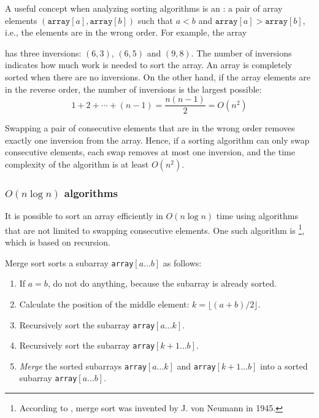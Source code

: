 A useful concept when analyzing sorting
algorithms is an :
a pair of array elements
$(\texttt{array}[a],\texttt{array}[b])$ such that
$a<b$ and $\texttt{array}[a]>\texttt{array}[b]$,
i.e., the elements are in the wrong order.
For example, the array
\begin{center}
\end{center}
has three inversions: $(6,3)$, $(6,5)$ and $(9,8)$.
The number of inversions indicates
how much work is needed to sort the array.
An array is completely sorted when
there are no inversions.
On the other hand, if the array elements
are in the reverse order,
the number of inversions is the largest possible:
\[1+2+\cdots+(n-1)=\frac{n(n-1)}{2} = O(n^2)\]

Swapping a pair of consecutive elements that are
in the wrong order removes exactly one inversion
from the array.
Hence, if a sorting algorithm can only
swap consecutive elements, each swap removes
at most one inversion, and the time complexity
of the algorithm is at least $O(n^2)$.

\subsubsection{$O(n \log n)$ algorithms}


It is possible to sort an array efficiently
in $O(n \log n)$ time using algorithms
that are not limited to swapping consecutive elements.
One such algorithm is \footnote{According to \cite{knu983},
merge sort was invented by J. von Neumann in 1945.},
which is based on recursion.

Merge sort sorts a subarray \texttt{array}$[a \ldots b]$ as follows:

\begin{enumerate}
\item If $a=b$, do not do anything, because the subarray is already sorted.
\item Calculate the position of the middle element: $k=\lfloor (a+b)/2 \rfloor$.
\item Recursively sort the subarray \texttt{array}$[a \ldots k]$.
\item Recursively sort the subarray \texttt{array}$[k+1 \ldots b]$.
\item \emph{Merge} the sorted subarrays \texttt{array}$[a \ldots k]$ and
\texttt{array}$[k+1 \ldots b]$
into a sorted subarray \texttt{array}$[a \ldots b]$.
\end{enumerate}


